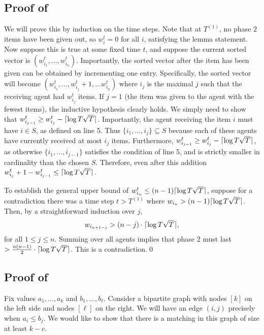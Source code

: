 \subsection{Proof of }
We will prove this by induction on the time steps. Note that at $T^{(1)}$, no phase 2 items have been given out, so $w^t_{i} = 0$ for all $i$, satisfying the lemma statement. Now suppose this is true at some fixed time $t$, and suppose the current sorted vector is $(w^t_{i_1}, \ldots, w^t_{i_n})$. Importantly, the sorted vector after the item has been given can be obtained by incrementing one entry. Specifically, the sorted vector will become $(w^t_{i_1}, \ldots, w^t_{{i_j}} + 1, \ldots  w^t_{i_n})$ where $i_j$ is the maximal $j$ such that the receiving agent had $w^t_{{i_j}}$ items. If $j = 1$ (the item was given to the agent with the fewest items), the inductive hypothesis clearly holds. We simply need to show that $w^t_{{i_{j - 1}}} \ge w^t_{{i_j}} - \lceil \log T \sqrt{T}\rceil$. Importantly, the agent receiving the item $i$ must have $i \in S$, as defined on line 5. Thus $\{i_1, \ldots, i_j\} \subseteq S$ because each of these agents have currently received at most $i_j$ items. Furthermore, $w^t_{{i_{j - 1}}} \ge w^t_{{i_j}} - \lceil \log T \sqrt{T}\rceil$, as otherwise $\{i_1, \ldots, i_{j - 1}\}$ satisfies the condition of line 5, and is strictly smaller in cardinality than the chosen $S$. Therefore, even after this addition $w^t_{{i_j}} + 1 - w^t_{{i_{j - 1}}} \le \lceil \log T \sqrt{T}\rceil$.

To establish the general upper bound of $w^t_{i_n} \le (n - 1) \lceil\log T \sqrt{T}\rceil$, suppose for a contradiction there was a time step $t > T^{(1)}$ where $w_{i_n} > (n-1) \lceil\log T \sqrt{T}\rceil$. Then, by a straightforward induction over $j$, \[w_{i_{n + 1 - j}} > (n - j) \cdot \lceil\log T \sqrt{T}\rceil,\] for all $1 \le j \le n$. Summing over all agents implies that phase 2 must last $> \frac{n(n - 1)}{2} \cdot \lceil\log T \sqrt{T}\rceil$. This is a contradiction.\qed

\subsection{Proof of }
Fix values $a_1, \ldots, a_k$ and $b_1, \ldots, b_\ell$. Consider a bipartite graph with nodes $[k]$ on the left side and nodes $[\ell]$ on the right. We will have an edge $(i, j)$ precisely when $a_i \le b_j$. We would like to show that there is a matching in this graph of size at least $k - c$.

